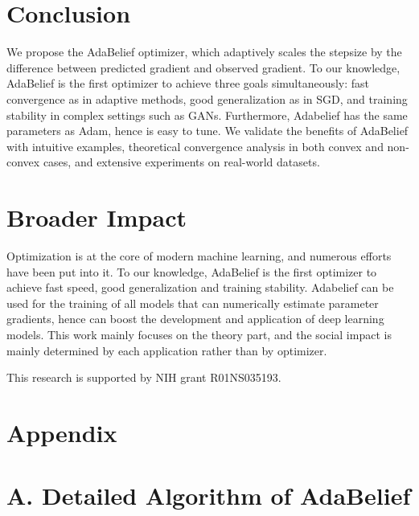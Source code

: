 \documentclass{article}
\begin{document}
\section{Conclusion}
We propose the AdaBelief optimizer, which adaptively scales the stepsize by the difference between predicted gradient and observed gradient. To our knowledge, AdaBelief is the first optimizer to achieve three goals simultaneously: fast convergence as in adaptive methods, good generalization as in SGD, and training stability in complex settings such as GANs. Furthermore, Adabelief has the same parameters as Adam, hence is easy to tune. We validate the benefits of AdaBelief with intuitive examples, theoretical convergence analysis in both convex and non-convex cases, and extensive experiments on real-world datasets.
\section*{Broader Impact}
Optimization is at the core of modern machine learning, and numerous efforts have been put into it. To our knowledge, AdaBelief is the first optimizer to achieve fast speed, good generalization and training stability. Adabelief can be used for the training of all models that can numerically estimate parameter gradients, hence can boost the development and application of deep learning models. This work mainly focuses on the theory part, and the social impact is mainly determined by each application rather than by optimizer.
\begin{ack}
This research is supported by NIH grant R01NS035193.
\end{ack}



%
\newpage
\appendix
\setcounter{section}{0}
\setcounter{equation}{0}
\setcounter{theorem}{0}
\setcounter{table}{0}
\setcounter{figure}{0}
\setcounter{algocf}{0}
\allowdisplaybreaks
\section*{{\LARGE Appendix}}
\section*{A. Detailed Algorithm of AdaBelief}
\end{document}
